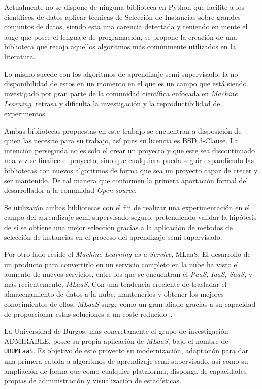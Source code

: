 
Actualmente no se dispone de ninguna biblioteca en Python que facilite a los científicos de datos aplicar técnicas de Selección de Instancias sobre grandes conjuntos de datos, siendo esta una carencia detectada y teniendo en mente el auge que posee el lenguaje de programación, se propone la creación de una biblioteca que recoja aquellos algoritmos más comúnmente utilizados en la literatura. 

Lo mismo sucede con los algoritmos de aprendizaje semi-supervisado, la no disponibilidad de estos en un momento en el que es un campo que está siendo investigado por gran parte de la comunidad científica enfocada en \textit{Machine Learning}, retrasa y dificulta la investigación y la reproductibilidad de experimentos.

Ambas bibliotecas propuestas en este trabajo se encuentran a disposición de quien las necesite para su trabajo, así pues su licencia es BSD 3-Clause. La intención perseguida no es solo el crear un proyecto y que este sea discontinuado una vez se finalice el proyecto, sino que cualquiera pueda seguir expandiendo las bibliotecas con nuevos algoritmos de forma que sea un proyecto capaz de crecer y ser mantenido. De tal manera que conformen la primera aportación formal del desarrollador a la comunidad \textit{Open source}.

Se utilizarán ambas bibliotecas con el fin de realizar una experimentación en el campo del aprendizaje semi-supervisado seguro, pretendiendo validar la hipótesis de si se obtiene una mejor selección gracias a la aplicación de métodos de selección de instancias en el proceso del aprendizaje semi-supervisado. 

Por otro lado reside el \textit{Machine Learning as a Service}, MLaaS. El desarrollo de un producto para convertirlo en un servicio completo en la nube ha visto el aumento de nuevos servicios, entre los que se encuentran el \textit{PaaS}, \textit{IaaS}, \textit{SaaS}, y más recientemente, \textit{MLaaS}. Con una tendencia creciente de trasladar el almacenamiento de datos a la nube, mantenerlos y obtener los mejores conocimientos de ellos, \textit{MLaaS} surge como un gran aliado gracias a su capacidad de proporcionar estas soluciones a un coste reducido~\cite{whatismlaas}.

La Universidad de Burgos, más concretamente el grupo de investigación ADMIRABLE, posee su propia aplicación de \textit{MLaaS}, bajo el nombre de \texttt{UBUMLaaS}. Es objetivo de este proyecto su modernización, adaptación para dar una primera cabida a algoritmos de aprendizaje semi-supervisado, así como su ampliación de forma que como cualquier plataforma, disponga de capacidades propias de administración y visualización de estadísticas.


